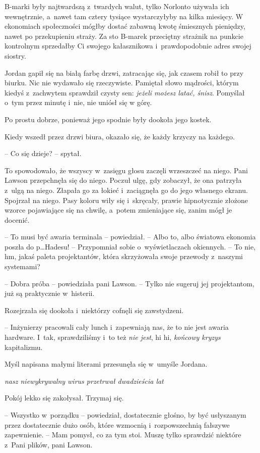 \documentclass[oneside,polish,11pt,sfheadings]{mwbk}
\begin{document}
B-marki były najtwardszą z~twardych walut, tylko Norlonto używała ich
wewnętrznie, a~nawet tam cztery tysiące wystarczyłyby na kilka miesięcy.
W ekonomiach społeczności mógłby dostać zabawną kwotę śmiesznych
pieniędzy, nawet po przekupieniu straży. Za sto B-marek przeciętny
strażnik na punkcie kontrolnym sprzedałby Ci swojego kałasznikowa i~prawdopodobnie adres swojej siostry.

Jordan gapił się na białą farbę drzwi, zatracając się, jak czasem robił
to przy biurku. Nic nie wydawało się rzeczywiste. Pamiętał słowo
mądrości, którym kiedyś z~zachwytem sprawdził czysty sen: \emph{jeżeli
możesz latać, śnisz}. Pomyślał o~tym przez minutę i~nie, nie uniósł się
w górę.

Po prostu dobrze, ponieważ jego spodnie były dookoła jego kostek.

Kiedy wszedł przez drzwi biura, okazało się, że każdy krzyczy na
każdego.

-- Co się dzieje? -- spytał.

To spowodowało, że wszyscy w~zasięgu głosu zaczęli wrzeszczeć na niego.
Pani Lawson przepchnęła się do niego. Poczuł ulgę, gdy zobaczył, że ona
patrzyła z~ulgą na niego. Złapała go za łokieć i~zaciągnęła go do jego
własnego ekranu. Spojrzał na niego. Pasy koloru wiły się i~skręcały,
prawie hipnotycznie złożone wzorce pojawiające się na chwilę, a~potem
zmieniające się, zanim mógł je docenić.

-- To musi być awaria terminala -- powiedział. -- Albo to, albo światowa
ekonomia poszła do p\ldots Hadesu! -- Przypomniał sobie o~wyświetlaczach
okiennych. -- To nie, hm, jakaś paleta projektantów, która skrzyżowała
swoje przewody z~naszymi systemami?

-- Dobra próba -- powiedziała pani Lawson. -- Tylko nie sugeruj jej
projektantom, już są praktycznie w~histerii.

Rozejrzała się dookoła i~niektórzy cofnęli się zawstydzeni.

-- Inżynierzy pracowali cały lunch i~zapewniają nas, że to nie jest
awaria hardware. I~tak, sprawdziliśmy i~to też \emph{nie jest}, hi hi,
\emph{końcowy kryzys} kapitalizmu.

Myśl napisana małymi literami przesunęła się w~umyśle Jordana.

\emph{nasz niewykrywalny wirus przetrwał dwadzieścia lat}

Pokój lekko się zakołysał. Trzymaj się.

-- Wszystko w~porządku -- powiedział, dostatecznie głośno, by być
usłyszanym przez dostatecznie dużo osób, które wzmocnią i~rozpowszechnią
fałszywe zapewnienie. -- Mam pomysł, co za tym stoi. Muszę tylko
sprawdzić niektóre z~Pani plików, pani Lawson.
\end{document}
